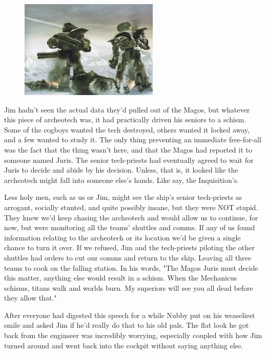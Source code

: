 \begin{figure}
	\begin{center}
		\includegraphics[width=\figwidth]{pics/11/44.png}
	\end{center}
\end{figure}
Jim hadn't seen the actual data they'd pulled out of the Magos, but whatever this piece of archeotech was, it had practically driven his seniors to a schism. 
Some of the cogboys wanted the tech destroyed, others wanted it locked away, and a few wanted to study it. 
The only thing preventing an immediate free-for-all was the fact that the thing wasn't here, and that the Magos had reported it to someone named Juris. 
The senior tech-priests had eventually agreed to wait for Juris to decide and abide by his decision. 
Unless, that is, it looked like the archeotech might fall into someone else's hands. 
Like say, the Inquisition's.

Less holy men, such as us or Jim, might see the ship's senior tech-priests as arrogant, socially stunted, and quite possibly insane, but they were NOT stupid. 
They knew we'd keep chasing the archeotech and would allow us to continue, for now, but were monitoring all the teams' shuttles and comms. 
If any of us found information relating to the archeotech or its location we'd be given a single chance to turn it over. 
If we refused, Jim and the tech-priests piloting the other shuttles had orders to cut our comms and return to the ship. 
Leaving all three teams to cook on the falling station. 
In his words, "The Magos Juris must decide this matter, anything else would result in a schism. 
When the Mechanicus schisms, titans walk and worlds burn. 
My superiors will see you all dead before they allow that."  

After everyone had digested this speech for a while Nubby put on his weaseliest smile and asked Jim if he'd really do that to his old pals. 
The flat look he got back from the enginseer was incredibly worrying, especially coupled with how Jim turned around and went back into the cockpit without saying anything else.

